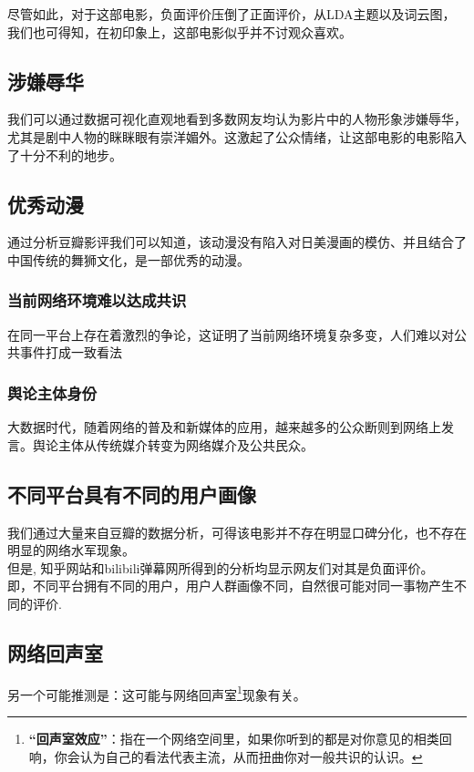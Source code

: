 \documentclass[12pt,a4paper,utf8]{article}
\begin{document}
尽管如此，对于这部电影，负面评价压倒了正面评价，从LDA主题以及词云图，我们也可得知，在初印象上，这部电影似乎并不讨观众喜欢。

\subsection{涉嫌辱华}
我们可以通过数据可视化直观地看到多数网友均认为影片中的人物形象涉嫌辱华，尤其是剧中人物的眯眯眼有崇洋媚外。这激起了公众情绪，让这部电影的电影陷入了十分不利的地步。

\subsection{优秀动漫}
通过分析豆瓣影评我们可以知道，该动漫没有陷入对日美漫画的模仿、并且结合了中国传统的舞狮文化，是一部优秀的动漫。

\subsubsection{当前网络环境难以达成共识}
在同一平台上存在着激烈的争论，这证明了当前网络环境复杂多变，人们难以对公共事件打成一致看法

\subsubsection{舆论主体身份}
大数据时代，随着网络的普及和新媒体的应用，越来越多的公众断则到网络上发言。舆论主体从传统媒介转变为网络媒介及公共民众。

\subsection{不同平台具有不同的用户画像}
我们通过大量来自豆瓣的数据分析，可得该电影并不存在明显口碑分化，也不存在明显的网络水军现象。\\

但是, 知乎网站和bilibili弹幕网所得到的分析均显示网友们对其是负面评价。\\

即，不同平台拥有不同的用户，用户人群画像不同，自然很可能对同一事物产生不同的评价.\\

\subsection{网络回声室}

另一个可能推测是：这可能与网络回声室\footnote{\noindent 
\textbf{“回声室效应”}：指在一个网络空间里，如果你听到的都是对你意见的相类回响，你会认为自己的看法代表主流，从而扭曲你对一般共识的认识。}现象有关。 \\
\end{document}
